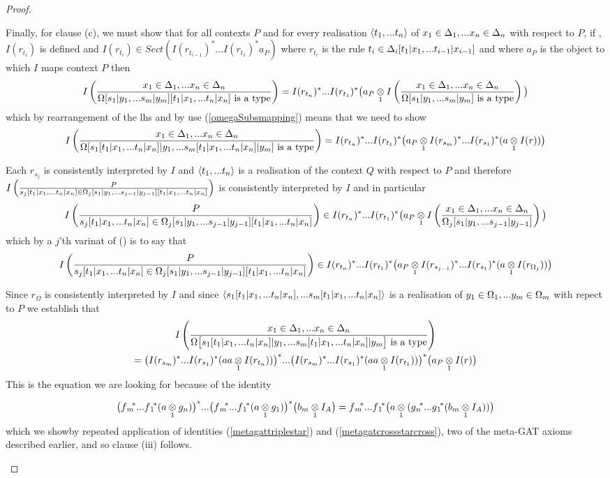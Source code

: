 \begin{proof}
\begin{enumerate}[(i)]
Finally, for clause (c), we must show that for all contexts $P$ 
and for every realisation $\tuple{\tn}$ of $\xDelta{n}$ with respect to $P$, 
if \foreachi, $I(r_{t_i})$ is defined and $I(r_{t_i}) \in Sect(I(r_{t_{i-1}})^* ... I(r_{t_1})^*a_P)$
where $r_{t_i}$ is the rule $\tDelta{i}$ and where $a_P$ is the object to which $I$ maps context $P$ then
$$\Imappedrule{\xDelta{n}}{\isT{\Omega[\SUBsFORy{m}][\SUBtFORx{n}]}}
                =I(r_{t_n})^* ... I(r_{t_1})^*\big(\crossx{a_P}{\Imappedrule{\xDelta{n}}{\isT{\Omega[\SUBsFORy{m}]}}}{1}\big)$$
which by rearrangement of the lhs and by use (\ref{omegaSubsmapping}) means that we need to show 
$$\Imappedrule{\xDelta{n}}{\isT{\Omega[s_1[\SUBtFORx{n}]|y_1,... s_m[\SUBtFORx{n}]|y_m]}}
                =I(r_{t_n})^* ... I(r_{t_1})^*\big(\crossx{a_P}{I(r_{s_m})^*...I(r_{s_1})^*(\crossx{a}{I(r)}{1})}{1}\big)$$

\newcommand{\IOmegaDoublySubstituted}[1]{\Omega_#1[\SUBsFORy{#1-1}][\SUBtFORx{n}]}
Each $r_{s_j}$ is consistently interpreted by $I$  and $\tuple{\tn}$ is a realisation
of the context $Q$ with respect to $P$ and therefore $\Imappedrule{P}{s_j[\SUBtFORx{n}] \in \IOmegaDoublySubstituted{j}}$ is consistently interpreted by $I$ and in particular
$$\Imappedrule{P}{\ofT{s_j[\SUBtFORx{n}]}{\IOmegaDoublySubstituted{j}}}
            \in I(r_{t_n})^* ... I(r_{t_1})^*\big(\crossx{a_P}{\Imappedrule{\xDelta{n}}{\Omega_j[\SUBsFORy{j-1}]}} {1}\big)$$
which by a $j$'th varinat of () is to say that
$$\Imappedrule{P}{\ofT{s_j[\SUBtFORx{n}]}{\IOmegaDoublySubstituted{j}}}
   \in I(r_{t_n})^* ... I(r_{t_1})^*\big(\crossx{a_P}{I(r_{s_{j-1}})^*...I(r_{s_1})^*(\crossx{a}{I(r_{\Omega_j})}{1})}{1}\big)$$

Since $r_\Omega$ is consistently interpreted by $I$ and since 
$\tuple{s_1[\SUBtFORx{n}],...s_m[\SUBtFORx{n}]}$ is a realisation of $\yOmega{m}$ with repect to $P$
we establish that
\begin{multline}
     \Imappedrule{\xDelta{n}}{\isT{\Omega\big[s_1[\SUBtFORx{n}]|y_1,... s_m[\SUBtFORx{n}]|y_m\big]}} \\
           =  \big(I(r_{s_m})^*...I(r_{s_1})^*(\crossx{aa}{I(r_{t_n})}{1})\big)
               ^* ... 
              \big(I(r_{s_m})^*...I(r_{s_1})^*(\crossx{aa}{I(r_{t_1})}{1})\big)
               ^*\big(\crossx{a_P}{I(r)}{1}\big)
\end{multline}
This is the equation we are looking for because of the identity

\newcommand{\clausethreelhs}{\big(\fmvectorstar (\crossx{a}{g_n}{1})\big)^* ... \big(\fmvectorstar (\crossx{a}{g_1}{1})\big) ^* \big(\crossx{b_m}{I_A}{1}\big)}
\newcommand{\clausethreerhs}{\fmvectorstar \big(  \crossx{a}{(\gnvectorstar(\crossx{b_m}{I_A}{1}))}{1} \big)}
\begin{equation*}
\clausethreelhs = \clausethreerhs                                       
\end{equation*}
which we showby  repeated application of identities (\ref{metagattriplestar})
and (\ref{metagatcrossstarcross}), two of the meta-GAT axioms described earlier,
and so clause (iii) follows.


\end{enumerate}
\end{proof}
